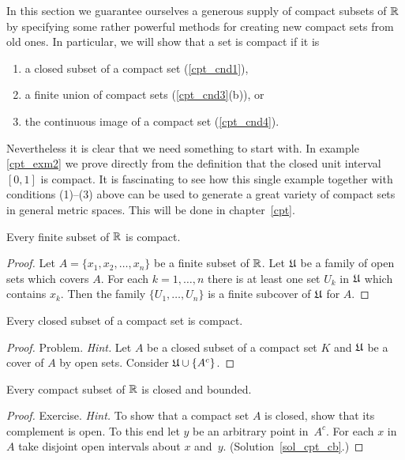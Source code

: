 In this section we guarantee ourselves a generous supply of compact subsets of $\mathbb{R}$ by
specifying some rather powerful methods for creating new compact sets from old ones. In
particular, we will show that a set is compact if it is
 \begin{enumerate}
  \item a closed subset of a compact set (\ref{cpt_cnd1}),
  \item a finite union of compact sets (\ref{cpt_cnd3}(b)), or
  \item the continuous image of a compact set (\ref{cpt_cnd4}).
 \end{enumerate}
Nevertheless it is clear that we need something to start with.  In example \ref{cpt_exm2} we
prove directly from the definition that the closed unit interval $[0,1]$ is compact.  It is
fascinating to see how this single example together with conditions (1)--(3) above can be used
to generate a great variety of compact sets in general metric spaces.  This will be done in
chapter~\ref{cpt}.

\begin{exam}\label{cpt_exm1} Every finite subset of $\mathbb{R}$ is compact.
\end{exam}

\begin{proof} Let $A = \{x_1,x_2, \dots, x_n\}$ be a finite subset of $\mathbb{R}$.  Let $\mathfrak{U}$ be a
family of open sets which covers $A$. For each $k = 1,\dots,n$ there is at least one set
$U_k$ in $\mathfrak{U}$ which contains $x_k$.  Then the family $\{U_1, \dots, U_n\}$ is a
finite subcover of $\mathfrak{U}$ for $A$.
\end{proof}

\begin{prop}\label{cpt_cnd1} Every closed subset of a compact set is compact.
\end{prop}

\begin{proof} Problem.  \emph{Hint.}  Let $A$ be a closed subset of a compact set $K$ and
$\mathfrak{U}$ be a cover of $A$ by open sets. Consider $\mathfrak{U} \cup \{A^c\}$.   \ns
\end{proof}

\begin{prop}\label{cpt_cb} Every compact subset of $\mathbb{R}$ is closed and bounded.
\end{prop}

\begin{proof} Exercise. \emph{Hint.}  To show that a compact set $A$ is closed, show that
its complement is open.  To this end let $y$ be an arbitrary point in~$A^c$.  For each $x$ in
$A$ take disjoint open intervals about $x$ and~$y$. (Solution~\ref{sol_cpt_cb}.)  \ns
\end{proof}

